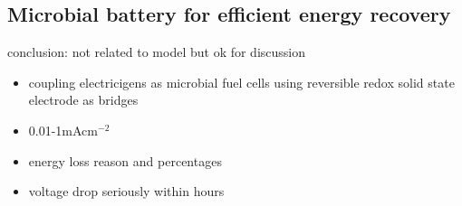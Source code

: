 \documentclass[a4paper,11pt]{article}
\begin{document}
    \subsection{Microbial battery for efficient energy recovery\autocite{xie2013microbial}}
    conclusion: not related to model but ok for discussion
    \begin{itemize}
        \item coupling electricigens as microbial fuel cells using reversible redox solid state electrode as bridges
        \item 0.01-1mAcm$^{-2}$
        \item energy loss reason and percentages
        \item voltage drop seriously within hours
    \end{itemize}
    
    \nocite{*}\printbibliography
\end{document}
